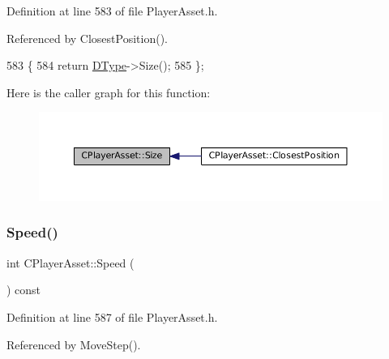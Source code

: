 Definition at line 583 of file Player\+Asset.\+h.



Referenced by Closest\+Position().


\begin{DoxyCode}
583                         \{
584             \textcolor{keywordflow}{return} \hyperlink{classCPlayerAsset_a5d61f73471e1e6f0a6ab15f2ffa7b359}{DType}->Size(); 
585         \};
\end{DoxyCode}
Here is the caller graph for this function\+:\nopagebreak
\begin{figure}[H]
\begin{center}
\leavevmode
\includegraphics[width=350pt]{classCPlayerAsset_a85a9e2ce62f557e93219676117159fec_icgraph}
\end{center}
\end{figure}
\hypertarget{classCPlayerAsset_af1c093600f1567e3abf1cefc0f5350d5}{}\label{classCPlayerAsset_af1c093600f1567e3abf1cefc0f5350d5} 
\subsubsection{\texorpdfstring{Speed()}{Speed()}}
{\footnotesize\ttfamily int C\+Player\+Asset\+::\+Speed (\begin{DoxyParamCaption}{ }\end{DoxyParamCaption}) const\hspace{0.3cm}{\ttfamily [inline]}}



Definition at line 587 of file Player\+Asset.\+h.



Referenced by Move\+Step().


